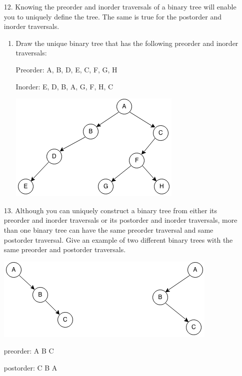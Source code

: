 \documentclass[10pt]{article}
\begin{document}
\begin{enumerate}
	\item[12.] Knowing the preorder and inorder traversals of a binary tree will enable you to uniquely define the tree. The same is true for the postorder and inorder traversals.
		\begin{enumerate}
			\item Draw the unique binary tree that has the following preorder and inorder traversals:
				
				\vspace{0.1cm}
				Preorder: A, B, D, E, C, F, G, H
				
				\vspace{0.1cm}
				Inorder: E, D, B, A, G, F, H, C
				
				\vspace{0.5cm}
				\includegraphics[scale=0.5]{images/26_12.png}
				\vspace{0.5cm}
		\end{enumerate}
	
	\item[13.] Although you can uniquely construct a binary tree from either its preorder and inorder traversals or its postorder and inorder traversals, more than one binary tree can have the same preorder traversal and same postorder traversal. Give an example of two different binary trees with the same preorder and postorder traversals.
	
		\vspace{0.5cm}
		\includegraphics[scale=0.5]{images/26_13.png}
		\vspace{0.5cm}
		
		preorder: A B C
		
		\vspace{0.1cm}
		postorder: C B A
		\vspace{0.5cm}
\end{enumerate}
\end{document}
